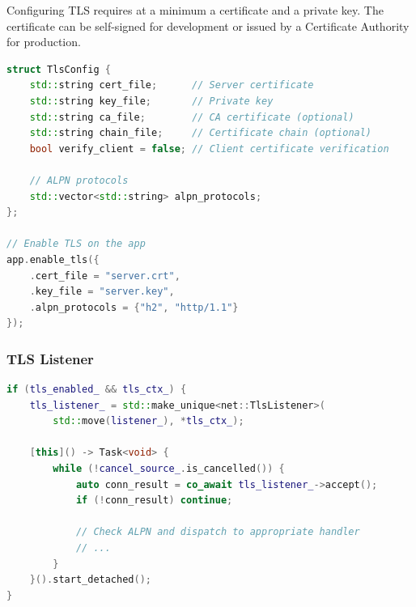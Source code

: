 Configuring TLS requires at a minimum a certificate and a private key. The certificate can be self-signed for development or issued by a Certificate Authority for production.

\begin{lstlisting}[language=C++, basicstyle=\small\ttfamily, caption={TLS configuration}]
struct TlsConfig {
    std::string cert_file;      // Server certificate
    std::string key_file;       // Private key
    std::string ca_file;        // CA certificate (optional)
    std::string chain_file;     // Certificate chain (optional)
    bool verify_client = false; // Client certificate verification
    
    // ALPN protocols
    std::vector<std::string> alpn_protocols;
};

// Enable TLS on the app
app.enable_tls({
    .cert_file = "server.crt",
    .key_file = "server.key",
    .alpn_protocols = {"h2", "http/1.1"}
});
\end{lstlisting}

\subsubsection{TLS Listener}

\begin{lstlisting}[language=C++, basicstyle=\small\ttfamily, caption={TLS listener}]
if (tls_enabled_ && tls_ctx_) {
    tls_listener_ = std::make_unique<net::TlsListener>(
        std::move(listener_), *tls_ctx_);
    
    [this]() -> Task<void> {
        while (!cancel_source_.is_cancelled()) {
            auto conn_result = co_await tls_listener_->accept();
            if (!conn_result) continue;
            
            // Check ALPN and dispatch to appropriate handler
            // ...
        }
    }().start_detached();
}
\end{lstlisting}

